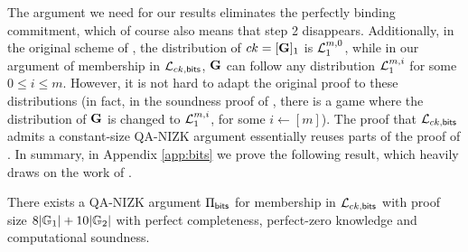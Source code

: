 The argument we need for our results eliminates the perfectly binding commitment, which of course also means that step 2 disappears. Additionally, in the original scheme of \cite{AC:GonHevRaf15}, the distribution of $ck=[\mathbf{{G}}]_1$ is $\mathcal{L}_1^{m,0}$, while in our argument of membership in 
$\mathcal{L}_{ck,\mathsf{bits}}$, $\mathbf{{G}}$ can follow any distribution $\mathcal{L}_1^{m,i}$ for some $0 \leq i \leq m$. 
However, it is not hard to adapt the original proof to these distributions (in fact, in the soundness proof of 
\cite{AC:GonHevRaf15}, there is a game where the distribution of $\mathbf{{G}}$ is changed to $\mathcal{L}_1^{m,i}$, for some $i \gets [m]$). The proof that $\mathcal{L}_{ck,\mathsf{bits}}$ admits a constant-size QA-NIZK argument essentially reuses parts of the proof of \cite{AC:GonHevRaf15}.  In summary, in Appendix \ref{app:bits} we prove the following result, which heavily draws on the work of \cite{AC:GonHevRaf15}. 

\begin{theorem} \label{theo:bits} There exists a QA-NIZK argument $\Pi_{\mathsf{bits}}$ for membership in $\mathcal{L}_{ck,\mathsf{bits}}$ with proof size  
$8|\mathbb{G}_1|+10|\mathbb{G}_2|$ with perfect completeness, perfect-zero knowledge and computational soundness. 
\end{theorem}


